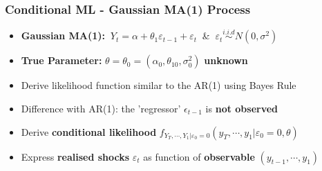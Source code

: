 \documentclass{beamer}
\begin{document}
					\begin{frame}
				\frametitle{Conditional ML - Gaussian MA(1) Process}
				\begin{itemize}
					
					\item[] \textbf{Gaussian MA(1):} $\:Y_t=\alpha+\theta_1\varepsilon_{t-1}+\varepsilon_t \:$ \& $\:\varepsilon_t\overset{i.i.d}{\sim} N(0,\sigma^2)$
					\pause
					\vspace{15pt}
					\item[] \textbf{True Parameter:} $\theta=\theta_0=(\alpha_0, \theta_{10}, \sigma^2_0)$ \textbf{unknown}
					\pause
					\vspace{15pt}
					\item[] Derive likelihood function similar to the AR(1) using Bayes Rule
					\pause
					\vspace{15pt}
					\item[] \hspace{30pt} Difference with AR(1): the 'regressor'  $\epsilon_{t-1}$ is \textbf{not observed}
					\pause
					\vspace{15pt}
					\item[]  \hspace{30pt} Derive \textbf{conditional likelihood }$f_{Y_T,\cdots, Y_1|\varepsilon_0=0}(y_T,\cdots,y_1|\varepsilon_0=0, \theta)$
					\pause
					\vspace{15pt}
					\item[]  \hspace{30pt} Express \textbf{realised shocks} $\varepsilon_t$ as function of \textbf{observable} $(y_{t-1}, \cdots, y_1)$ 
					
						\end{itemize}
				\end{frame}
\end{document}
